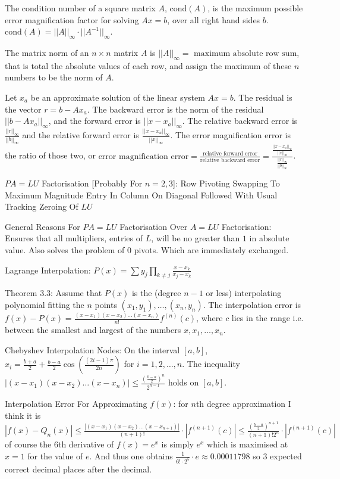 \small
\twocolumn

The condition number of a square matrix $A$, $\text{cond}(A)$, is the maximum possible error magnification factor for solving $Ax = b$, over all right hand sides $b$. $\text{cond}(A) = ||A||_{\infty} \cdot || A^{-1} ||_{\infty}$.

The matrix norm of an $n \times n$ matrix $A$ is $||A||_{\infty} = \text{ maximum absolute row sum}$, that is total the absolute values of each row, and assign the maximum of these $n$ numbers to be the norm of $A$.

Let $x_a$ be an approximate solution of the linear system $Ax = b$. The residual is the vector $r = b-Ax_a$. The backward error is the norm of the residual $|| b-Ax_a ||_{\infty}$, and the forward error is $|| x-x_a ||_{\infty}$. The relative backward error is $\frac{||r||_{\infty}}{||b||_{\infty}}$ and the relative forward error is $\frac{||x-x_a||_{\infty}}{||x||_{\infty}}$. The error magnification error is the ratio of those two, or $\text{error magnification error} = \frac{\text{relative forward error}}{\text{relative backward error}} = \frac{\frac{||x-x_a||_{\infty}}{||x||_{\infty}}}{\frac{||r||_{\infty}}{||b||_{\infty}}}$.

$PA=LU$ Factorisation [Probably For $n=2,3$]: Row Pivoting Swapping To Maximum Magnitude Entry In Column On Diagonal Followed With Usual Tracking Zeroing Of $LU$

General Reasons For $PA=LU$ Factorisation Over $A=LU$ Factorisation: \\
Ensures that all multipliers, entries of $L$, will be no greater than $1$ in absolute value. Also solves the problem of $0$ pivots. Which are immediately exchanged.

Lagrange Interpolation: $P(x) = \sum y_j \prod_{k \neq j} \frac{x-x_k}{x_j-x_k}$

Theorem 3.3: Assume that $P(x)$ is the (degree $n-1$ or less) interpolating polynomial fitting the $n$ points $(x_1,y_1),\dots,(x_n,y_n)$. The interpolation error is $f(x)-P(x) = \frac{(x-x_1)(x-x_2)\dots (x-x_n)}{n!} f^{(n)}(c)$, where $c$ lies in the range i.e. between the smallest and largest of the numbers $x,x_1,\dots,x_n$.

Chebyshev Interpolation Nodes: On the interval $[a,b]$, $x_i = \frac{b+a}{2} + \frac{b-a}{2} \cos \left( \frac{(2 i-1)\pi}{2n} \right)$ for $i=1,2,\dots ,n$. The inequality $|(x-x_1)(x-x_2) \dots (x-x_n)| \le \frac{ \left( \frac{b-a}{2} \right)^n }{2^{n-1}}$ holds on $[a,b]$.

Interpolation Error For Approximating $f(x)$: for $n$th degree approximation I think it is $|f(x)-Q_n(x)| \le \frac{|(x-x_1)(x-x_2) \dots (x-x_{n+1})|}{(n+1)!} \cdot |f^{(n+1)}(c)| \le \frac{\left( \frac{b-a}{2} \right)^{n+1}}{(n+1)! 2^n} \cdot |f^{(n+1)}(c)|$ of course the $6$th derivative of $f(x)=e^x$ is simply $e^x$ which is maximised at $x=1$ for the value of $e$. And thus one obtains $\frac{1}{6! \cdot 2^5} \cdot e \approx 0.00011798$ so $3$ expected correct decimal places after the decimal.

